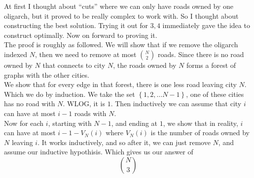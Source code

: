\begin{solution}
    At first I thought about ``cuts'' where we can only have roads owned by one
    oligarch, but it proved to be really complex to work with. So I thought
    about constructing the best solution. Trying it out for $3, 4$ immediately
    gave the idea to construct optimally. Now on forward to proving it.\\

    The proof is roughly as followed. We will show that if we remove the
    oligarch indexed $N$, then we need to remove at most ${N \choose 2}$
    roads. Since there is no road owned by $N$ that connects to city $N$, the
    roads owned by $N$ forms a forest of graphs with the other cities.\\

    We show that for every edge in that forest, there is one less road leaving
    city $N$. Which we do by induction. We take the set $\left\{1, 2, \dots
    N-1\right\}$, one of these cities has no road with $N$. WLOG, it is $1$.
    Then inductively we can assume that city $i$ can have at most $i-1$ roads
    with $N$.\\

    Now for each $i$, starting with $N-1$, and ending at $1$, we show that in
    reality, $i$ can have at most $i-1 - V_N(i)$ where $V_N(i)$ is the number
    of roads owned by $N$ leaving $i$. It works inductively, and so after it,
    we can just remove $N$, and assume our inductive hypothisis. Which gives
    us our answer of \[\boxed{{N \choose 3}}\] 
\end{solution}
